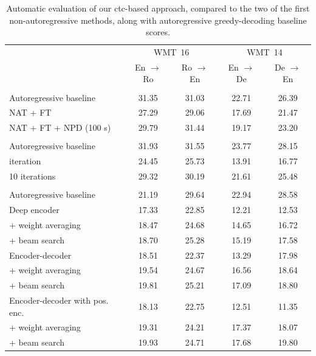 \begin{table}
  \centering
  \begin{tabular}{lcccc}
    \toprule
     & \multicolumn{2}{c}{WMT~16} & \multicolumn{2}{c}{WMT~14} \\
     & En $\rightarrow$ Ro & Ro $\rightarrow$ En & En $\rightarrow$ De & De $\rightarrow$ En \\
    \midrule
    \citet{gu2017nonautoregressive} & & & & \\
    Autoregressive baseline & 31.35 & 31.03 & 22.71 & 26.39 \\
    \addlinespace
    NAT + FT & 27.29 & 29.06 & 17.69 & 21.47 \\
    NAT + FT + NPD (100 s) & 29.79 & 31.44 & 19.17 & 23.20 \\
    \midrule
    \citet{lee-etal-2018-deterministic} & & & & \\
    Autoregressive baseline & 31.93 & 31.55  & 23.77 & 28.15 \\
    \addlinespace
    1 iteration & 24.45 & 25.73 & 13.91 & 16.77 \\
    10 iterations & 29.32 & 30.19 & 21.61 & 25.48 \\
    \midrule
    \citet{libovicky-helcl-2018-end} & & & & \\
    Autoregressive baseline & 21.19 & 29.64 & 22.94 & 28.58 \\
    \addlinespace
    Deep encoder & 17.33 & 22.85 & 12.21 & 12.53 \\
    \quad + weight averaging & 18.47 & 24.68 & 14.65 & 16.72 \\
    \quad + beam search & 18.70 & 25.28 & 15.19 & 17.58 \\
    \addlinespace
    Encoder-decoder  & 18.51 & 22.37 & 13.29 & 17.98 \\
    \quad + weight averaging & 19.54 & 24.67 & 16.56 & 18.64 \\
    \quad + beam search & 19.81 & 25.21 & 17.09 & 18.80  \\
    \addlinespace
    Encoder-decoder with pos. enc. & 18.13 & 22.75 & 12.51 & 11.35 \\
    \quad + weight averaging & 19.31 & 24.21 & 17.37 & 18.07 \\
    \quad + beam search & 19.93 & 24.71 & 17.68 & 19.80 \\
    \bottomrule
  \end{tabular}

  \caption{Automatic evaluation of our \acs{ctc}-based approach, compared to
    the two of the first non-autoregressive methods, along with autoregressive
    greedy-decoding baseline scores. }%
  \label{tab:end-to-end:bleu}
\end{table}

